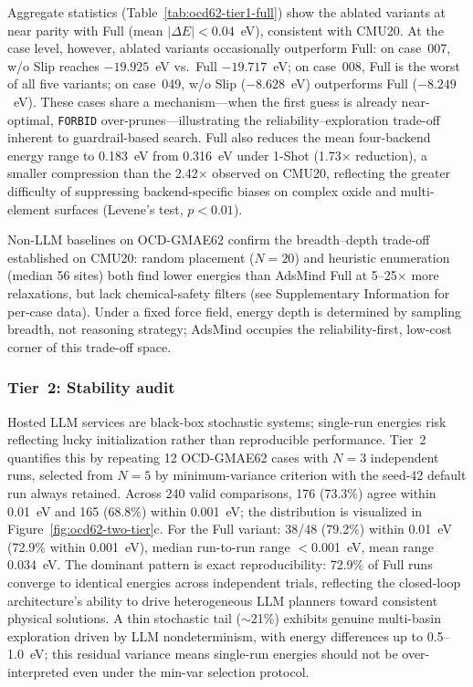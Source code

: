 Aggregate statistics (Table~\ref{tab:ocd62-tier1-full}) show the ablated variants at near parity with Full (mean $|\Delta E| < 0.04$~eV), consistent with CMU20.
At the case level, however, ablated variants occasionally outperform Full: on case~007, w/o Slip reaches $-19.925$~eV vs.\ Full $-19.717$~eV; on case~008, Full is the worst of all five variants; on case~049, w/o Slip ($-8.628$~eV) outperforms Full ($-8.249$~eV).
These cases share a mechanism---when the first guess is already near-optimal, \texttt{FORBID} over-prunes---illustrating the reliability--exploration trade-off inherent to guardrail-based search.
Full also reduces the mean four-backend energy range to 0.183~eV from 0.316~eV under 1-Shot (1.73$\times$ reduction), a smaller compression than the 2.42$\times$ observed on CMU20, reflecting the greater difficulty of suppressing backend-specific biases on complex oxide and multi-element surfaces (Levene's test, $p < 0.01$).

Non-LLM baselines on OCD-GMAE62 confirm the breadth--depth trade-off established on CMU20: random placement ($N=20$) and heuristic enumeration (median 56 sites) both find lower energies than AdsMind Full at 5--25$\times$ more relaxations, but lack chemical-safety filters (see Supplementary Information for per-case data).
Under a fixed force field, energy depth is determined by sampling breadth, not reasoning strategy; AdsMind occupies the reliability-first, low-cost corner of this trade-off space.

\subsubsection{Tier~2: Stability audit}

Hosted LLM services are black-box stochastic systems; single-run energies risk reflecting lucky initialization rather than reproducible performance.
Tier~2 quantifies this by repeating 12 OCD-GMAE62 cases with $N=3$ independent runs, selected from $N=5$ by minimum-variance criterion with the seed-42 default run always retained.
Across 240 valid comparisons, 176 (73.3\%) agree within 0.01~eV and 165 (68.8\%) within 0.001~eV; the distribution is visualized in Figure~\ref{fig:ocd62-two-tier}c.
For the Full variant: 38/48 (79.2\%) within 0.01~eV (72.9\% within 0.001~eV), median run-to-run range $<$0.001~eV, mean range 0.034~eV.
The dominant pattern is exact reproducibility: 72.9\% of Full runs converge to identical energies across independent trials, reflecting the closed-loop architecture's ability to drive heterogeneous LLM planners toward consistent physical solutions.
A thin stochastic tail ($\sim$21\%) exhibits genuine multi-basin exploration driven by LLM nondeterminism, with energy differences up to 0.5--1.0~eV; this residual variance means single-run energies should not be over-interpreted even under the min-var selection protocol.

